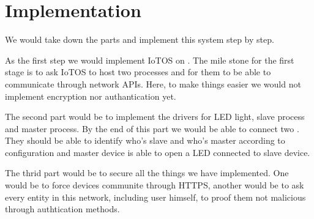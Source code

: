 \section{Implementation}

We would take down the parts and implement this system step by step.

As the first step we would implement IoTOS on \rpi. 
The mile stone for the first stage is to ask IoTOS to host two processes and for them to be able to communicate through network APIs.
Here, to make things easier we would not implement encryption nor authantication yet.

The second part would be to implement the drivers for LED light, slave process and master process.
By the end of this part we would be able to connect two \rpis. 
They should be able to identify who's slave and who's master according to configuration and master device is able to open a LED  connected to slave device.

The thrid part would be to secure all the things we have implemented.
One would be to force devices communite through HTTPS, another would be to ask every entity in this network, including user himself, to proof them not malicious through authtication methods.
